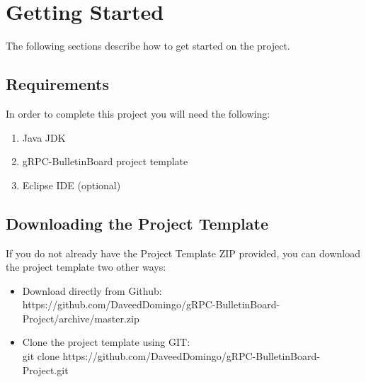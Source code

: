 \documentclass{article}
\begin{document}
\section{Getting Started} %
The following sections describe how to get started on the project. 

\subsection{Requirements}
In order to complete this project you will need the following:
\begin{enumerate}
\item Java JDK
\item gRPC-BulletinBoard project template
\item Eclipse IDE (optional)
\end{enumerate}

\subsection{Downloading the Project Template}
If you do not already have the Project Template ZIP provided, you can download the project template two other ways:
\begin{itemize}
\item Download directly from Github:\\ https://github.com/DaveedDomingo/gRPC-BulletinBoard-Project/archive/master.zip
\item Clone the project template using GIT:\\ git clone https://github.com/DaveedDomingo/gRPC-BulletinBoard-Project.git
\end{itemize} 
\end{document}
